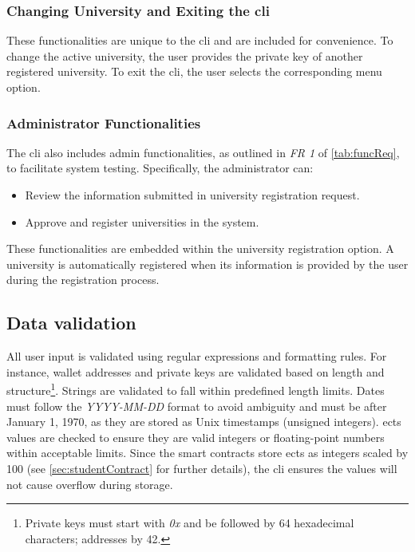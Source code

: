 \subsubsection{Changing University and Exiting the \acrshort{cli}}
These functionalities are unique to the \acrshort{cli} and are included for convenience. To change the active university, the user provides the private key of another registered university. To exit the \acrshort{cli}, the user selects the corresponding menu option.

\subsubsection{Administrator Functionalities}
The \acrshort{cli} also includes admin functionalities, as outlined  in \textit{FR 1} of \cref{tab:funcReq}, to facilitate system testing. Specifically, the administrator can:
\begin{itemize}
    \item Review the information submitted in university registration request.
    \item Approve and register universities in the system.
\end{itemize}
These functionalities are embedded within the university registration option. A university is automatically registered when its information is provided by the user during the registration process.

\subsection{Data validation}
All user input is validated using regular expressions and formatting rules. For instance, wallet addresses and private keys are validated based on length and structure\footnote{Private keys must start with \textit{0x} and be followed by 64 hexadecimal characters; addresses by 42.}. Strings are validated to fall within predefined length limits. Dates must follow the \textit{YYYY-MM-DD} format to avoid ambiguity and must be after January 1, 1970, as they are stored as Unix timestamps (unsigned integers). \acrshort{ects} values are checked to ensure they are valid integers or floating-point numbers within acceptable limits. Since the smart contracts store \acrshort{ects} as integers scaled by 100 (see \cref{sec:studentContract} for further details), the \acrshort{cli} ensures the values will not cause overflow during storage.
